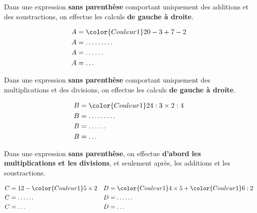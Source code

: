 \begin{minipage}[c]{0.48\textwidth}
\begin{Règle}

Dans une expression \textbf{sans parenthèse} comportant
uniquement des additions et des soustractions, on effectue les calculs \textbf{de gauche à droite}.
\end{Règle}

\begin{Exemple} 
\vspace{-0.5cm}
\begin{align*}
A & ={\color{Couleur1}20-3}+7-2\\
A & = \ldots \ldots \ldots\\
A & = \ldots \ldots\\
A & = \ldots
\end{align*}

\end{Exemple}
\end{minipage} \hfill
\begin{minipage}[c]{0.48\textwidth}


\begin{Règle}
Dans une expression \textbf{sans parenthèse} comportant
uniquement des multiplications et des divisions, on effectue les calculs \textbf{de gauche à droite}.
\end{Règle}

\begin{Exemple} 
\vspace{-0.5cm}
\begin{align*}
B & ={\color{Couleur1}24:3}\times2:4\\
B & = \ldots \ldots \ldots\\
B & = \ldots \ldots\\
B & =\ldots
\end{align*}

\end{Exemple}

\end{minipage} 


\begin{Règle}
Dans une expression \textbf{sans parenthèse}, on
effectue \textbf{d'abord les multiplications et les divisions}, et
seulement après, les additions et les soustractions.
\end{Règle}


\begin{Exemples}
\begin{align*}
C & =12-{\color{Couleur1}5\times2} & D & ={\color{Couleur1}4\times5}+{\color{Couleur1}6:2}\\
C & = \ldots \ldots & D & = \ldots \ldots\\
C & = \ldots & D & =\ldots
\end{align*}
\end{Exemples}

